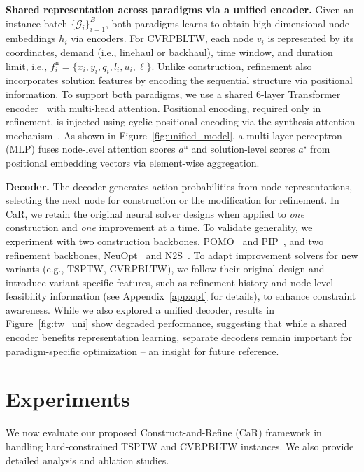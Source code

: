\documentclass{article} %
\begin{document}
\textbf{Shared representation across paradigms via a unified encoder.}
Given an instance batch $\{\mathcal{G}_i\}_{i=1}^B$, both paradigms learns to obtain high-dimensional node embeddings $h_i$ via encoders. For CVRPBLTW, each node $v_i$ is represented by its coordinates, demand (i.e., linehaul or backhaul), time window, and duration limit, i.e., $f^{\text{n}}_i = \{ x_i, y_i, q_i, l_i, u_i, \ell\}$.  Unlike construction, refinement also incorporates solution features by encoding the sequential structure via positional information. To support both paradigms, we use a shared 6-layer Transformer encoder~\citep{kwon2020pomo} with multi-head attention. Positional encoding, required only in refinement, is injected using cyclic positional encoding via the synthesis attention mechanism~\citep{ma2022efficient}. As shown in Figure~\ref{fig:unified_model}, a multi-layer perceptron (MLP) fuses node-level attention scores $a^\text{n}$ and solution-level scores $a^\text{s}$ from positional embedding vectors via element-wise aggregation. 

\textbf{Decoder.} The decoder generates action probabilities from node representations, selecting the next node for construction or the modification for refinement. In CaR, we retain the original neural solver designs when applied to {\textit{one} construction and \textit{one} improvement at a time}. To validate generality, we experiment with two construction backbones, POMO~\citep{kwon2020pomo} and PIP~\citep{bi2024learning}, and two refinement backbones, NeuOpt~\citep{ma2023learning} and N2S~\citep{ma2022efficient}.
To adapt improvement solvers for new variants (e.g., TSPTW, CVRPBLTW), we follow their original design and introduce variant-specific features, such as refinement history and node-level feasibility information (see Appendix~\ref{app:opt} for details), to enhance constraint awareness. While we also explored a unified decoder, results in Figure~\ref{fig:tw_uni} show degraded performance, suggesting that while a shared encoder benefits representation learning, separate decoders remain important for paradigm-specific optimization -- an insight for future reference.



\section{Experiments}
\label{exp}
\label{sec:exp}

We now evaluate our proposed Construct-and-Refine (CaR) framework in handling hard-constrained TSPTW and CVRPBLTW instances. We also provide detailed analysis and ablation studies.
\end{document}
